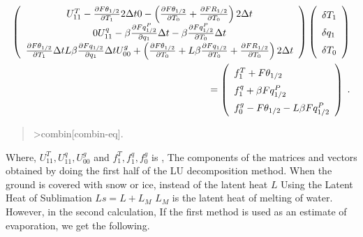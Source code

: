 \begin{eqnarray}
  \renewcommand{\arraystretch}{1.5}
  \left( \begin{array}{ccc}
      U_{11}^T - \frac{\partial F\theta_{1/2}}{\partial T_1} 2 \Delta t
      0
      - \left( \frac{\partial F\theta_{1/2}}{\partial T_0}
                         + \frac{\partial FR_{1/2}}{\partial T_0}\right) 2 \Delta t \\
      0
      U_{11}^q - \beta \frac{\partial Fq^P_{1/2}}{\partial q_1} \Delta t
      - \beta \frac{\partial Fq^P_{1/2}}{\partial T_0} \Delta t \\
        \frac{\partial F\theta_{1/2}}{\partial T_1} \Delta t
      L \beta \frac{\partial Fq_{1/2}}{\partial q_1} \Delta t
      U_{00}^g + \left(\frac{\partial F\theta_{1/2}}{\partial T_0}
                + L \beta \frac{\partial Fq_{1/2}}{\partial T_0}
                + \frac{\partial FR_{1/2}}{\partial T_0} \right) 2 \Delta t \\
  \end{array} \right)
  \left( \begin{array}{l}
      \delta T_1 \\ \delta q_1 \\ \delta T_0 \\
  \end{array} \right)   \\
=  \left( \begin{array}{l}
      f_1^T + F\theta_{1/2} \\  
      f_1^q + \beta Fq^P_{1/2} \\  
      f_0^g - F\theta_{1/2} - L \beta Fq^P_{1/2} \\  
  \end{array} \right) \; .
\end{eqnarray}

\begin{quote}
\protect\hypertarget{combin-eq}{}{ \textgreater combin{[}combin-eq{]}}.
\end{quote}

Where, \(U_{11}^T, U_{11}^q, U_{00}^g\) and \(f_1^T, f_1^q, f_0^g\) is ,
The components of the matrices and vectors obtained by doing the first
half of the LU decomposition method. When the ground is covered with
snow or ice, instead of the latent heat \(L\) Using the Latent Heat of
Sublimation \(Ls = L + L_M\) \(L_M\) is the latent heat of melting of
water. However, in the second calculation, If the first method is used
as an estimate of evaporation, we get the following.

